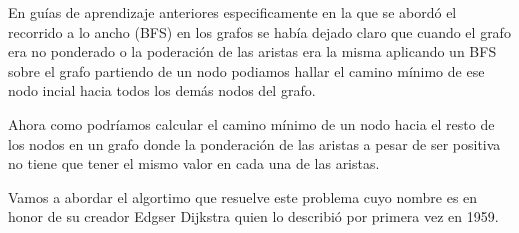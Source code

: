 En guías de aprendizaje anteriores especificamente en la que se abordó el recorrido a lo ancho (BFS) en los grafos se había dejado claro que cuando el grafo era no ponderado o la poderación de las aristas era la misma  aplicando un BFS sobre el grafo partiendo de un nodo podiamos hallar el camino mínimo de ese nodo incial hacia todos los demás nodos del grafo.

Ahora como podríamos calcular el camino mínimo de un nodo hacia el resto de los nodos en un grafo donde la ponderación de las aristas a pesar de ser  positiva no tiene que tener el mismo valor en cada una de las aristas. 

Vamos a abordar el algortimo que resuelve este problema cuyo nombre es en honor de su creador Edgser Dijkstra quien lo
describió por primera vez en 1959. 